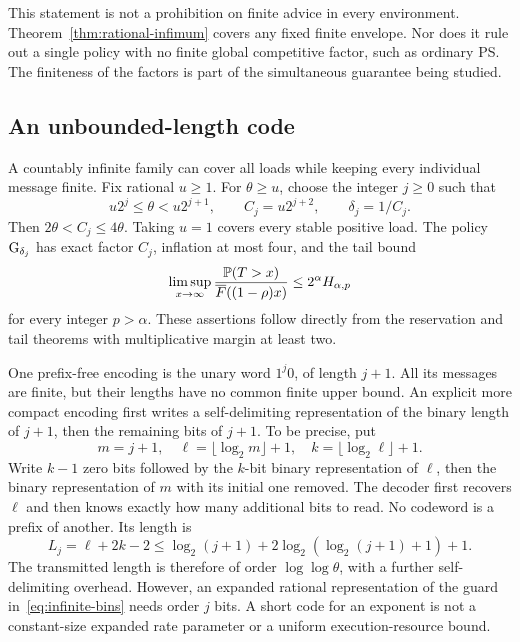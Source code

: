 This statement is not a prohibition on finite advice in every environment. Theorem~\ref{thm:rational-infimum} covers any fixed finite envelope. Nor does it rule out a single policy with no finite global competitive factor, such as ordinary PS. The finiteness of the factors is part of the simultaneous guarantee being studied.

\subsection{An unbounded-length code}
A countably infinite family can cover all loads while keeping every individual message finite. Fix rational $u\geq1$. For $\theta\geq u$, choose the integer $j\geq0$ such that
\begin{equation}\label{eq:infinite-bins}
 u2^j\leq\theta<u2^{j+1},
 \qquad C_j=u2^{j+2},\qquad\delta_j=1/C_j.
\end{equation}
Then $2\theta<C_j\leq4\theta$. Taking $u=1$ covers every stable positive load. The policy $\operatorname{G}_{\delta_j}$ has exact factor $C_j$, inflation at most four, and the tail bound
\begin{equation}\label{eq:variable-tail}
 \limsup_{x\to\infty}\frac{\mathbb P(T>x)}{\overline F((1-\rho)x)}
 \leq 2^\alpha H_{\alpha,p}
\end{equation}
for every integer $p>\alpha$. These assertions follow directly from the reservation and tail theorems with multiplicative margin at least two.

One prefix-free encoding is the unary word $1^j0$, of length $j+1$. All its messages are finite, but their lengths have no common finite upper bound. An explicit more compact encoding first writes a self-delimiting representation of the binary length of $j+1$, then the remaining bits of $j+1$. To be precise, put
\[
 m=j+1,\quad \ell=\lfloor\log_2m\rfloor+1,
 \quad k=\lfloor\log_2\ell\rfloor+1.
\]
Write $k-1$ zero bits followed by the $k$-bit binary representation of $\ell$, then the binary representation of $m$ with its initial one removed. The decoder first recovers $\ell$ and then knows exactly how many additional bits to read. No codeword is a prefix of another. Its length is
\begin{equation}\label{eq:delta-length}
 L_j=\ell+2k-2
 \leq\log_2(j+1)+2\log_2(\log_2(j+1)+1)+1.
\end{equation}
The transmitted length is therefore of order $\log\log\theta$, with a further self-delimiting overhead. However, an expanded rational representation of the guard in~\eqref{eq:infinite-bins} needs order $j$ bits. A short code for an exponent is not a constant-size expanded rate parameter or a uniform execution-resource bound.

